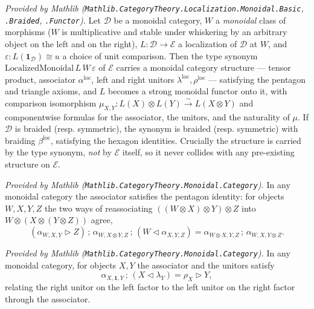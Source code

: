 \begin{theorem}
  \label{thm:localizedMonoidal_mathlib}
  \mathlibok
  \textit{Provided by Mathlib
  (\texttt{Mathlib.CategoryTheory.Localization.Monoidal.Basic},
  \texttt{.Braided}, \texttt{.Functor}).}
  Let \(\mathcal{D}\) be a monoidal category, \(W\) a \emph{monoidal} class of
  morphisms (\(W\) is
  multiplicative and stable under whiskering by an arbitrary object on the left
  and on the right), \(L : \mathcal{D} \to \mathcal{E}\) a localization of
  \(\mathcal{D}\) at \(W\), and \(\varepsilon : L(\mathbf{1}_{\mathcal{D}}) \cong u\)
  a choice of unit comparison. Then the type synonym
  \(\mathrm{LocalizedMonoidal}\,L\,W\,\varepsilon\) of \(\mathcal{E}\) carries a
  monoidal category structure --- tensor product, associator
  \(\alpha^{\mathrm{loc}}\), left and right unitors
  \(\lambda^{\mathrm{loc}}, \rho^{\mathrm{loc}}\) --- satisfying the pentagon and
  triangle axioms, and \(L\) becomes a strong monoidal functor onto it,
  with comparison isomorphism
  \(\mu_{X,Y} : L(X) \otimes L(Y) \xrightarrow{\sim} L(X \otimes Y)\) and
  componentwise formulas for the associator, the unitors, and the naturality of
  \(\mu\). If \(\mathcal{D}\) is braided (resp. symmetric), the
  synonym is braided (resp. symmetric) with braiding \(\beta^{\mathrm{loc}}\),
  satisfying the hexagon identities. Crucially the
  structure is carried by the type synonym, \emph{not} by \(\mathcal{E}\) itself,
  so it never collides with any pre-existing structure on \(\mathcal{E}\).
\end{theorem}

\begin{lemma}
  \label{lem:monoidal_pentagon_mathlib}
  \mathlibok
  \textit{Provided by Mathlib (\texttt{Mathlib.CategoryTheory.Monoidal.Category}).}
  In any monoidal category the associator satisfies the pentagon identity: for
  objects \(W, X, Y, Z\) the two ways of reassociating
  \(((W \otimes X) \otimes Y) \otimes Z\) into
  \(W \otimes (X \otimes (Y \otimes Z))\) agree,
  \[
    (\alpha_{W,X,Y} \rhd Z) \,;\, \alpha_{W, X \otimes Y, Z}
      \,;\, (W \lhd \alpha_{X,Y,Z})
      = \alpha_{W \otimes X, Y, Z} \,;\, \alpha_{W, X, Y \otimes Z}.
  \]
\end{lemma}

\begin{lemma}
  \label{lem:monoidal_triangle_mathlib}
  \mathlibok
  \textit{Provided by Mathlib (\texttt{Mathlib.CategoryTheory.Monoidal.Category}).}
  In any monoidal category, for objects \(X, Y\) the associator and the unitors
  satisfy
  \[
    \alpha_{X, \mathbf{1}, Y} \,;\, (X \lhd \lambda_Y) = \rho_X \rhd Y,
  \]
  relating the right unitor on the left factor to the left unitor on the right
  factor through the associator.
\end{lemma}

